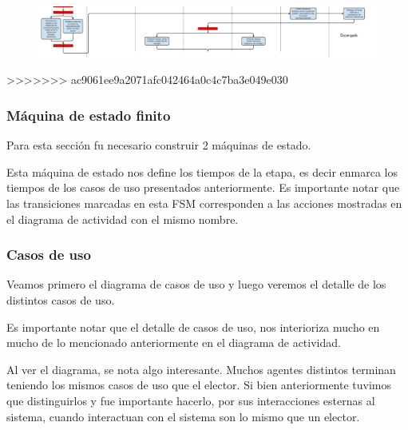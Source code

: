 \begin{figure}[h!]
\centering
\includegraphics[scale=0.5]{imagenes/actividad/actividadPreparacion3}
\end{figure}
>>>>>>> ac9061ee9a2071afc042464a0c4c7ba3e049e030

\subsubsection{Máquina de estado finito}

Para esta sección fu necesario construir 2 máquinas de estado.

\begin{figure}[H]
\centering
\end{figure}

Esta máquina de estado nos define los tiempos de la etapa, es decir enmarca los tiempos de los casos de uso presentados anteriormente. Es importante notar que las transiciones marcadas en esta FSM corresponden a las acciones mostradas en el diagrama de actividad con el mismo nombre.

\begin{figure}[H]
\centering
\end{figure}



\subsubsection{Casos de uso}

Veamos primero el diagrama de casos de uso y luego veremos el detalle de los distintos casos de uso.

Es importante notar que el detalle de casos de uso, nos interioriza mucho en mucho de lo mencionado anteriormente en el diagrama de actividad. 


Al ver el diagrama, se nota algo interesante. Muchos agentes distintos terminan teniendo los mismos casos de uso que el elector. Si bien anteriormente tuvimos que distinguirlos y fue importante hacerlo, por sus interacciones esternas al sistema, cuando interactuan con el sistema son lo mismo que un elector.

